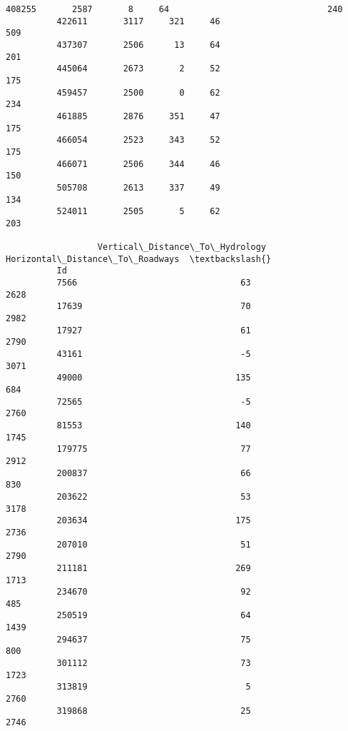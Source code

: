 \documentclass[11pt]{article}
\begin{document}
\begin{Verbatim}[commandchars=\\\{\}]
          408255       2587       8     64                               240   
          422611       3117     321     46                               509   
          437307       2506      13     64                               201   
          445064       2673       2     52                               175   
          459457       2500       0     62                               234   
          461885       2876     351     47                               175   
          466054       2523     343     52                               175   
          466071       2506     344     46                               150   
          505708       2613     337     49                               134   
          524011       2505       5     62                               203   
          
                  Vertical\_Distance\_To\_Hydrology  Horizontal\_Distance\_To\_Roadways  \textbackslash{}
          Id                                                                        
          7566                                63                             2628   
          17639                               70                             2982   
          17927                               61                             2790   
          43161                               -5                             3071   
          49000                              135                              684   
          72565                               -5                             2760   
          81553                              140                             1745   
          179775                              77                             2912   
          200837                              66                              830   
          203622                              53                             3178   
          203634                             175                             2736   
          207010                              51                             2790   
          211181                             269                             1713   
          234670                              92                              485   
          250519                              64                             1439   
          294637                              75                              800   
          301112                              73                             1723   
          313819                               5                             2760   
          319868                              25                             2746   

\end{Verbatim}
\end{document}
